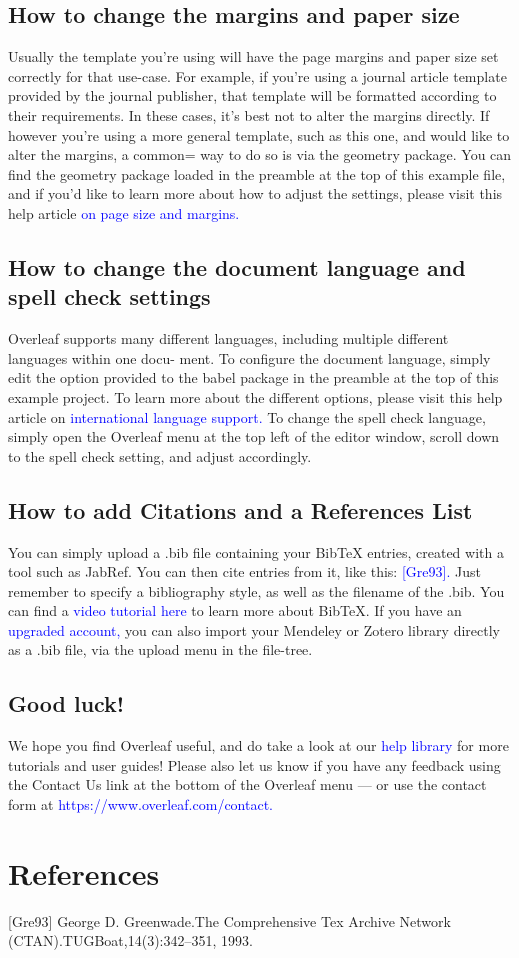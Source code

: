 \documentclass{article}
\begin{document}
	\subsection{How to change the margins and paper size}
	Usually the template you’re using will have the page margins and paper size set correctly for that
	use-case. For example, if you’re using a journal article template provided by the journal publisher,
	that template will be formatted according to their requirements. In these cases, it’s best not to alter
	the margins directly.
	If however you’re using a more general template, such as this one, and would like to alter the
	margins, a common= way to do so is via the geometry package. You can find the geometry package
	loaded in the preamble at the top of this example file, and if you’d like to learn more about how to
	adjust the settings, please visit this help article \textcolor{blue}{on page size and margins.}
	\subsection{How to change the document language and spell check settings}
	Overleaf supports many different languages, including multiple different languages within one docu-
	ment.
	To configure the document language, simply edit the option provided to the babel package in the
	preamble at the top of this example project. To learn more about the different options, please visit
	this help article on \textcolor{blue}{international language support.}
	To change the spell check language, simply open the Overleaf menu at the top left of the editor
	window, scroll down to the spell check setting, and adjust accordingly.
	\subsection{How to add Citations and a References List}
	You can simply upload a .bib file containing your BibTeX entries, created with a tool such as JabRef.
	You can then cite entries from it, like this: \textcolor{blue}{[Gre93].} Just remember to specify a bibliography style, as
	well as the filename of the .bib. You can find a \textcolor{blue}{video tutorial here} to learn more about BibTeX.
	If you have an \textcolor{blue}{upgraded account,} you can also import your Mendeley or Zotero library directly as
	a .bib file, via the upload menu in the file-tree.
	\subsection{Good luck!}
	We hope you find Overleaf useful, and do take a look at our \textcolor{blue}{help library} for more tutorials and user
	guides! Please also let us know if you have any feedback using the Contact Us link at the bottom of
	the Overleaf menu — or use the contact form at \textcolor{blue}{https://www.overleaf.com/contact.}
	\section{References}
	[Gre93] George D. Greenwade.The Comprehensive Tex Archive Network (CTAN).TUGBoat,14(3):342–351, 1993.
\end{document}
